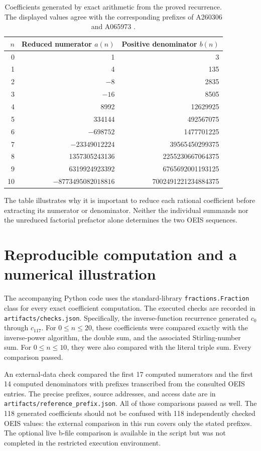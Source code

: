 \documentclass[11pt,letterpaper]{article}
\numberwithin{equation}{section}
\theoremstyle{remark}
\begin{document}
\begin{table}[htbp]
\centering
\small
\begin{tabular}{r r r}
\toprule
$n$ & Reduced numerator $a(n)$ & Positive denominator $b(n)$\\
\midrule
0 & 1 & 3\\
1 & 4 & 135\\
2 & $-8$ & 2835\\
3 & $-16$ & 8505\\
4 & 8992 & 12629925\\
5 & 334144 & 492567075\\
6 & $-698752$ & 1477701225\\
7 & $-23349012224$ & 39565450299375\\
8 & 1357305243136 & 2255230667064375\\
9 & 6319924923392 & 6765692001193125\\
10 & $-8773495082018816$ & 7002491221234884375\\
\bottomrule
\end{tabular}
\caption{Coefficients generated by exact arithmetic from the proved
recurrence. The displayed values agree with the corresponding prefixes
of A260306 and A065973 \cite{oeis260306,oeis065973}.}
\label{tab:coefficients}
\end{table}

The table illustrates why it is important to reduce each rational
coefficient before extracting its numerator or denominator. Neither the
individual summands nor the unreduced factorial prefactor alone determines
the two OEIS sequences.

\section{Reproducible computation and a numerical illustration}
\label{sec:verification}

The accompanying Python code uses the standard-library
\texttt{fractions.Fraction} class for every exact coefficient computation.
The executed checks are recorded in \texttt{artifacts/checks.json}.
Specifically, the inverse-function recurrence generated $c_0$ through
$c_{117}$. For $0\leq n\leq20$, these coefficients were compared exactly
with the inverse-power algorithm, the double sum, and the associated
Stirling-number sum. For $0\leq n\leq10$, they were also compared with the
literal triple sum. Every comparison passed.

An external-data check compared the first 17 computed numerators and the
first 14 computed denominators with prefixes transcribed from the
consulted OEIS entries. The precise prefixes, source addresses, and access
date are in \texttt{artifacts/reference\_prefix.json}. All of those
comparisons passed as well. The 118 generated coefficients should not be
confused with 118 independently checked OEIS values: the external
comparison in this run covers only the stated prefixes. The optional
live b-file comparison is available in the script but was not completed
in the restricted execution environment.
\end{document}
